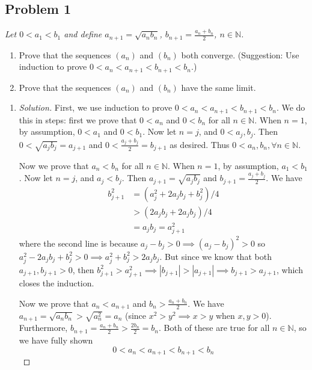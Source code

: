 \documentclass{article}
\newcommand{\N}{{\mathbb N}}
\begin{document}
\subsection*{Problem 1}
{\it Let $0 < a_1 < b_1$ and define
	$a_{n+1} = \sqrt{a_nb_n}$, $b_{n+1} = \frac{a_n + b_n}{2}$, $n \in \N$.
\begin{enumerate}
	\item Prove that the sequences $(a_n)$ and $(b_n)$ both converge.
		(Suggestion: Use induction to prove $0 < a_n < a_{n+1} < b_{n+1} < b_n$.)
	\item Prove that the sequences $(a_n)$ and $(b_n)$ have the same limit.
\end{enumerate}}

\begin{enumerate}
	\item \begin{proof}[Solution]\let\qed\relax
		First, we use induction to prove $0 < a_n < a_{n+1} < b_{n+1} < b_n$.
		We do this in steps:
		first we prove that $0 < a_n$ and $0< b_n$ for all $n \in \N$.
		When $n = 1$, by assumption, $0 < a_1$ and $0 < b_1$.
		Now let $n = j$, and $0 < a_j,b_j$.
		Then $0 < \sqrt{a_jb_j} = a_{j+1}$
		and $0 < \frac{a_j+b_j}{2} = b_{j+1}$
		as desired.
		Thus $0 < a_n,b_n, \forall n \in \N$.

		Now we prove that $a_n < b_n$ for all $n \in \N$.
		When $n = 1$, by assumption, $a_1 < b_1$.
		Now let $n = j$, and $a_j < b_j$.
		Then $a_{j+1} = \sqrt{a_jb_j}$
		and $b_{j+1} = \frac{a_j + b_j}{2}$.
		We have
		\begin{align*}
			b_{j+1}^2
			&= (a_j^2 + 2a_jb_j + b_j^2)/4\\
			&> (2a_jb_j + 2a_jb_j)/4\\
			&= a_jb_j = a_{j+1}^2
		\end{align*}
		where the second line is because $a_j - b_j > 0 \implies (a_j - b_j)^2 > 0$
		so $a_j^2 - 2a_jb_j + b_j^2 > 0 \implies a_j^2 + b_j^2 > 2a_jb_j$.
		But since we know that both $a_{j+1}, b_{j+1} > 0$,
		then $b^2_{j+1} > a^2_{j+1} \implies |b_{j+1}| > |a_{j+1}|
		\implies b_{j+1} > a_{j+1}$, which closes the induction.

		Now we prove that $a_n < a_{n+1}$ and $b_n > \frac{a_n+b_n}{2}$.
		We have $a_{n+1} = \sqrt{a_nb_n} > \sqrt{a_n^2} = a_n$
		(since $x^2 > y^2 \implies x > y$ when $x,y > 0$).
		Furthermore, $b_{n+1} = \frac{a_n + b_n}{2} > \frac{2b_n}{2} = b_n$.
		Both of these are true for all $n \in \N$,
		so we have fully shown
		\[
			0 < a_n < a_{n+1} < b_{n+1} < b_n
		\]


\end{proof}
\end{enumerate}
\end{document}
